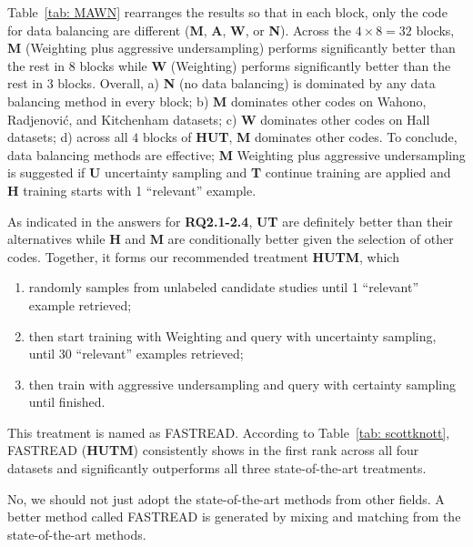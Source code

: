 \documentclass{svjour3}
\theoremstyle{break}
\begin{document}
Table~\ref{tab: MAWN} rearranges the results so that in each block, only the code for data balancing are different (\textbf{M}, \textbf{A}, \textbf{W}, or \textbf{N}). Across the $4\times 8 = 32$ blocks, \textbf{M} (Weighting plus aggressive undersampling) performs significantly better than the rest in 8 blocks while \textbf{W} (Weighting) performs significantly better than the rest in 3 blocks. Overall, a) \textbf{N} (no data balancing) is dominated by any data balancing method in every block; b) \textbf{M} dominates other codes on Wahono, Radjenovi{\'c}, and Kitchenham datasets; c) \textbf{W} dominates other codes on Hall datasets; d) across all $4$ blocks of \textbf{HUT}, \textbf{M} dominates other codes. To conclude, data balancing methods are effective; \textbf{M} Weighting plus aggressive undersampling is suggested if \textbf{U} uncertainty sampling and \textbf{T} continue training are applied and \textbf{H} training starts with 1 ``relevant'' example.

As indicated in the answers for \textbf{RQ2.1-2.4}, \textbf{UT} are definitely better than their alternatives while \textbf{H} and \textbf{M} are conditionally better given the selection of other codes. Together, it forms our recommended treatment \textbf{HUTM}, which 
\begin{enumerate}
\item
randomly samples from unlabeled candidate studies until 1 ``relevant'' example retrieved;
\item
then start training with Weighting and query with uncertainty sampling, until 30 ``relevant'' examples retrieved;
\item
then train with aggressive undersampling and query with certainty sampling until finished.
\end{enumerate}

This treatment is named as FASTREAD. According to Table~\ref{tab: scottknott}, FASTREAD (\textbf{HUTM}) consistently shows in the first rank across all four datasets and significantly outperforms all three state-of-the-art treatments.

\begin{lesson}
    No, we should not just adopt the state-of-the-art methods from other fields. A better method called FASTREAD is generated by mixing and matching from the state-of-the-art methods.
\end{lesson}
\end{document}
